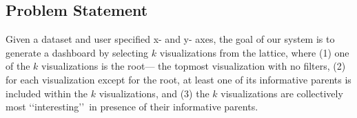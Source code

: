 \subsection{Problem Statement}

Given a dataset and user specified x- and y- axes, the goal of our system is to generate a dashboard by selecting $k$ visualizations from the lattice, where (1) one of the $k$ visualizations is the root--- the topmost visualization with no filters, (2) for each visualization except for the root, at least one of its informative parents is included within the $k$ visualizations, and (3) the $k$ visualizations are collectively most \lq\lq interesting\rq\rq\ in presence of their informative parents.

